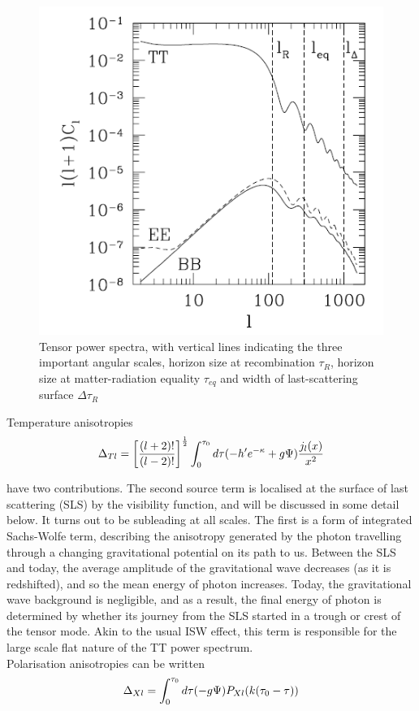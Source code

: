 \documentclass[a4paper,10pt]{article}
\newcommand{\half}{\frac{1}{2}}
\newcommand{\ltwo}{\left[\frac{(l+2)!}{(l-2)!}\right]}
\begin{document}
\begin{figure}[h]
  \includegraphics[width=0.5\linewidth]{tensorpowerspectra.png}
  \centering
  \caption{Tensor power spectra, with vertical lines indicating the three important angular scales, horizon size at recombination $\tau_R$, horizon size at matter-radiation equality $\tau_{eq}$ and width of last-scattering surface $\Delta\tau_R$}
  \label{tensorpower}
\end{figure}


Temperature anisotropies 
\begin{equation}
\Delta_{Tl} = \ltwo^\half \int_0^{\tau_0} d\tau (-h'e^{-\kappa}+g\Psi)\frac{j_l(x)}{x^2}\\
\end{equation}

have two contributions. The second source term is localised at the surface of last scattering (SLS) by the visibility function, and will be discussed in some detail below. It turns out to be subleading at all scales. The first is a form of integrated Sachs-Wolfe term, describing the anisotropy generated by the photon travelling through a changing gravitational potential on its path to us. Between the SLS and today, the average amplitude of the gravitational wave decreases (as it is redshifted), and so the mean energy of photon increases. Today, the gravitational wave background is negligible, and as a result, the final energy of photon is determined by whether its journey from the SLS started in a trough or crest of the tensor mode. Akin to the usual ISW effect, this term is responsible for the large scale flat nature of the TT power spectrum.\\


Polarisation anisotropies can be written
\begin{equation}
\Delta_{Xl} = \int_0^{\tau_0} d\tau (-g\Psi) P_{Xl}(k(\tau_0-\tau))\\
\end{equation}
\end{document}
